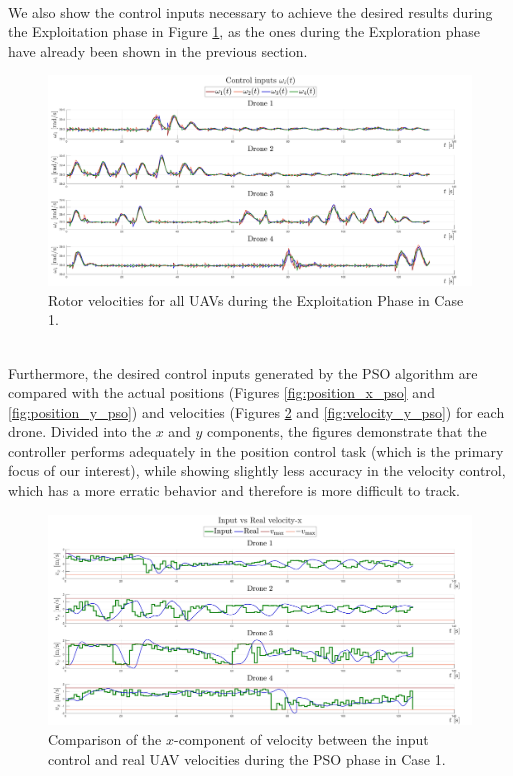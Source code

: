 \documentclass[main]{subfiles}
\begin{document}
\noindent\\
We also show the control inputs necessary to achieve the desired
results during the Exploitation phase in Figure \ref{fig:rotor_vel_pso}, as the 
ones during the Exploration phase have already been shown in the previous section.
\begin{figure}
    \centering
    \includegraphics[width=\textwidth]{images/rotor_vels_pso.pdf}
    \caption[rotor_vel Case 1]{Rotor velocities for all UAVs during the Exploitation Phase in Case 1.}
    \label{fig:rotor_vel_pso}
\end{figure}

\noindent\\
Furthermore, the desired control inputs generated by the PSO algorithm are 
compared with the actual positions (Figures \ref{fig:position_x_pso} and \ref{fig:position_y_pso}) and 
velocities (Figures \ref{fig:velocity_x_pso} and \ref{fig:velocity_y_pso}) for each drone. 
Divided into the $x$ and $y$ components, the figures demonstrate that the controller 
performs adequately in the position control task (which is the primary focus of our interest), 
while showing slightly less accuracy in the velocity control, which has a more erratic behavior and therefore is more 
difficult to track.
\begin{figure}
    \centering
    \includegraphics[width=\textwidth]{images/comparison_velocity-x_pso.pdf}
    \caption[Velocity-X Case 1]{Comparison of the $x$-component of velocity between the input control and real UAV velocities during the PSO phase in Case 1.}
    \label{fig:velocity_x_pso}
\end{figure}
\end{document}
